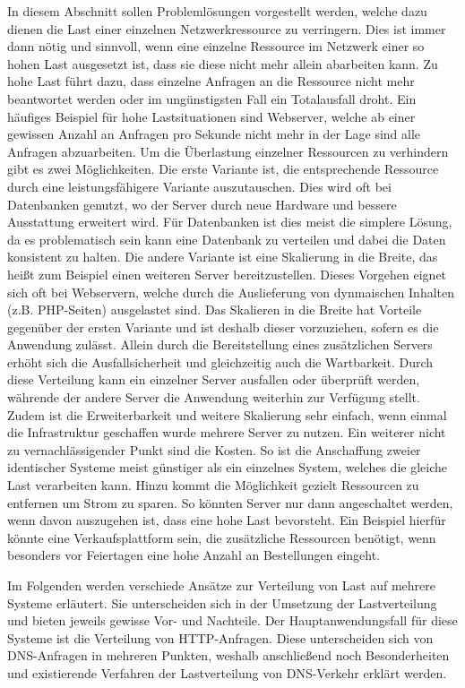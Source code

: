 \documentclass[a4paper, 12pt, BCOR10mm, DIV12, toc=bibliography, toc=listof, german]{scrbook}
\begin{document}
		In diesem Abschnitt sollen Problemlösungen vorgestellt werden, welche dazu dienen die Last einer
		einzelnen Netzwerkressource zu verringern. Dies ist immer dann nötig und sinnvoll, wenn eine
		einzelne Ressource im Netzwerk einer so hohen Last ausgesetzt ist, dass sie diese nicht mehr
		allein abarbeiten kann. Zu hohe Last führt dazu, dass einzelne Anfragen an die Ressource nicht
		mehr beantwortet werden oder im ungünstigsten Fall ein Totalausfall droht. Ein häufiges Beispiel
		für hohe Lastsituationen sind Webserver, welche ab einer gewissen Anzahl an Anfragen pro Sekunde
		nicht mehr in der Lage sind alle Anfragen abzuarbeiten. Um die Überlastung einzelner Ressourcen
		zu verhindern gibt es zwei Möglichkeiten. Die erste Variante ist, die entsprechende Ressource
		durch eine leistungsfähigere Variante auszutauschen. Dies wird oft bei Datenbanken genutzt, wo
		der Server durch neue Hardware und bessere Ausstattung erweitert wird.  Für Datenbanken ist dies
		meist die simplere Lösung, da es problematisch sein kann eine Datenbank zu verteilen und dabei
		die Daten konsistent zu halten. Die andere Variante ist eine Skalierung in die Breite, das heißt
		zum Beispiel einen weiteren Server bereitzustellen. Dieses Vorgehen eignet sich oft bei
		Webservern, welche durch die Auslieferung von dynmaischen Inhalten (z.B. PHP-Seiten) ausgelastet
		sind. Das Skalieren in die Breite hat Vorteile gegenüber der ersten Variante und ist deshalb
		dieser vorzuziehen, sofern es die Anwendung zulässt.  Allein durch die Bereitstellung eines
		zusätzlichen Servers erhöht sich die Ausfallsicherheit und gleichzeitig auch die Wartbarkeit.
		Durch diese Verteilung kann ein einzelner Server ausfallen oder überprüft werden, währende der
		andere Server die Anwendung weiterhin zur Verfügung stellt. Zudem ist die Erweiterbarkeit und
		weitere Skalierung sehr einfach, wenn einmal die Infrastruktur geschaffen wurde mehrere Server
		zu nutzen. Ein weiterer nicht zu vernachlässigender Punkt sind die Kosten. So ist die
		Anschaffung zweier identischer Systeme meist günstiger als ein einzelnes System, welches die
		gleiche Last verarbeiten kann. Hinzu kommt die Möglichkeit gezielt Ressourcen zu entfernen um
		Strom zu sparen. So könnten Server nur dann angeschaltet werden, wenn davon auszugehen ist, dass
		eine hohe Last bevorsteht.  Ein Beispiel hierfür könnte eine Verkaufsplattform sein, die
		zusätzliche Ressourcen benötigt, wenn	besonders vor Feiertagen eine hohe Anzahl an Bestellungen
		eingeht.

		Im Folgenden werden verschiede Ansätze zur Verteilung von Last auf mehrere Systeme erläutert.
		Sie unterscheiden sich in der Umsetzung der Lastverteilung und bieten jeweils gewisse Vor- und
		Nachteile. Der Hauptanwendungsfall für diese Systeme ist die Verteilung von HTTP-Anfragen.
		Diese unterscheiden sich von DNS-Anfragen in mehreren Punkten, weshalb anschließend noch
		Besonderheiten und existierende Verfahren der Lastverteilung von DNS-Verkehr erklärt werden.
\end{document}
